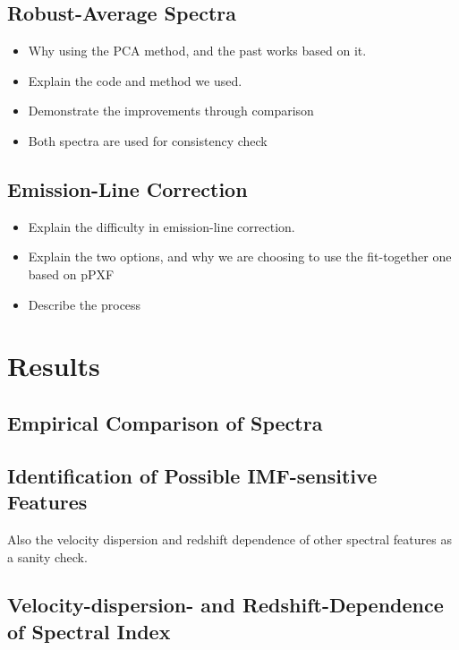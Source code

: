 \documentclass[preprint]{aastex}
\begin{document}
\begin{CJK*}{UTF8}{gbsn}
\subsection{Robust-Average Spectra} 

\begin{itemize}
  \item Why using the PCA method, and the past works based on it.  
  \item Explain the code and method we used.
  \item Demonstrate the improvements through comparison 
  \item Both spectra are used for consistency check 
\end{itemize}
  
\subsection{Emission-Line Correction} 

\begin{itemize}
    \item Explain the difficulty in emission-line correction.  
    \item Explain the two options, and why we are choosing to use the fit-together
    one based on pPXF 
    \item Describe the process 
\end{itemize}

\section{Results}

\subsection{Empirical Comparison of Spectra}

\subsection{Identification of Possible IMF-sensitive Features} 

Also the velocity dispersion and redshift dependence of other spectral 
  features as a sanity check. 

\subsection{Velocity-dispersion- and Redshift-Dependence of Spectral Index}


\end{CJK*}
\end{document}
